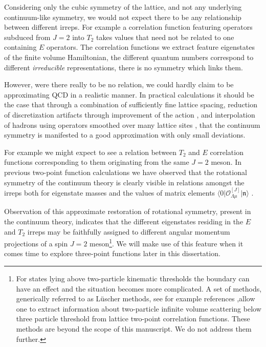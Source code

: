 Considering only the cubic symmetry of the lattice, and not any underlying continuum-like symmetry, we would not expect there to be any relationship between different irreps. For example a correlation function featuring operators subduced from $J=2$ into  $T_2$ takes values that need not be related to one containing $E$ operators. The correlation functions we extract feature  eigenstates of the finite volume Hamiltonian, the different quantum numbers correspond to different \emph{irreducible} representations, there is no symmetry which links them.

However, were there really to be no relation, we could hardly claim to be approximating QCD in a realistic manner. In practical calculations it should be the case that through a combination of sufficiently fine lattice spacing, reduction of discretization artifacts through improvement of the action \cite{Symanzik:1983dc}, and interpolation of hadrons using operators smoothed over many lattice sites \cite{Davoudi:2012ya}, that the continuum symmetry is manifested to a good approximation with only small deviations. 

For example we might expect to see a relation between $T_2$ and $E$ correlation functions corresponding to them originating from the same $J=2$ meson. In previous two-point function calculations we have observed that the rotational symmetry of the continuum theory is clearly visible in relations amongst the irreps both for eigenstate masses and the values of matrix elements $\big\langle 0 \big| \mathcal{O}_{\Lambda \mu}^{[J]} \big| \mathfrak{n} \big\rangle$ \cite{Dudek:2009qf, Dudek:2010wm}.  

Observation of this approximate restoration of rotational symmetry, present in the continuum theory, indicates that the different eigenstates residing in the $E$ and $T_2$ irreps may be faithfully assigned to different angular momentum projections of a spin $J=2$ meson\footnote{For states lying above two-particle kinematic thresholds the boundary can have an effect and the situation becomes more complicated. A set of methods, generically referred to as L{\"u}scher methods, see for example references \cite{Kim:2005gf,Luscher:1986pf,Rummukainen:1995vs} ,allow one to extract information about two-particle infinite volume scattering below three particle threshold from lattice two-point correlation functions. These methods are beyond the scope of this manuscript. We do not address them further.}. We will make use of this feature when it comes time to explore three-point functions later in this dissertation. 


